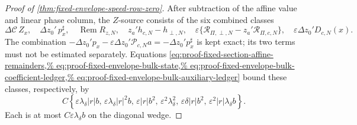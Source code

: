 \begin{proof}[Proof of
\cref{thm:fixed-envelope-speed-row-zero}]
After subtraction of the affine value and linear phase column, the
\(Z\)-source consists of the six combined classes
\begin{equation}
 \Delta\mathcal C\,Z_x,\quad
 \Delta z_0'\,p_x^\sharp,\quad
 \operatorname{Rem}R_{z,N},\quad
 z_a'h_{c,N}-h_{\perp,N},\quad
 \varepsilon\{\mathcal R_{\Pi,\perp,N}
       -z_a'\mathcal R_{\Pi,c,N}\},\quad
 \varepsilon\Delta z_0'D_{c,N}(x).              \label{eq:proof-fixed-envelope-Z-term-classes}
\end{equation}
The combination
\(-\Delta z_0'p_x-\varepsilon\Delta z_0'\mathscr P_{c,N}a
=-\Delta z_0'p_x^\sharp\) is kept exact; its two terms must not be
estimated separately.  Equations
\cref{eq:proof-fixed-section-affine-remainders,%
eq:proof-fixed-envelope-bulk-state,%
eq:proof-fixed-envelope-bulk-coefficient-ledger,%
eq:proof-fixed-envelope-bulk-auxiliary-ledger}
bound these classes, respectively, by
\begin{equation}
 C\left\{
 \varepsilon\lambda_\delta|r|b,\,
 \varepsilon\lambda_\delta|r|^2b,\,
 \varepsilon|r|b^2,\,
 \varepsilon^2\lambda_\delta^2,\,
 \varepsilon\delta|r|b^2,\,
 \varepsilon^2|r|\lambda_\delta b
 \right\}.                                      \label{eq:proof-fixed-envelope-Z-class-sizes}
\end{equation}
Each is at most \(C\varepsilon\lambda_\delta b\) on the diagonal
wedge.


\end{proof}
